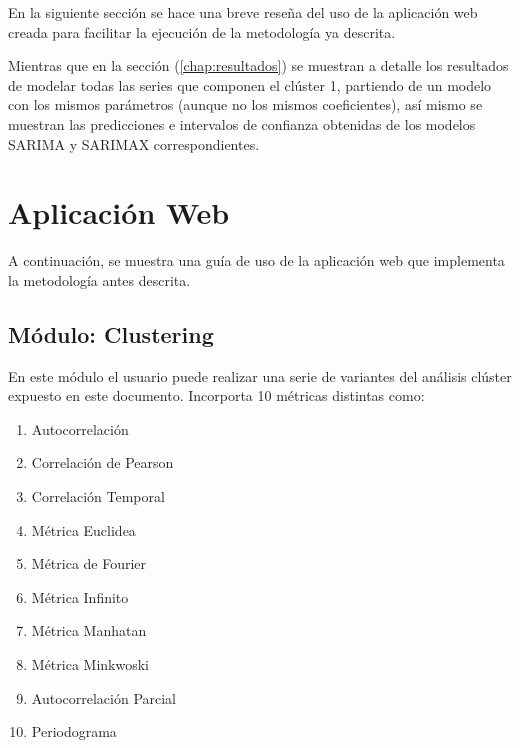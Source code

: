 \documentclass[12pt,oneside]{book}\usepackage[]{graphicx}\usepackage[]{color}
\theoremstyle{definition} %
\begin{document}
En la siguiente sección se hace una breve reseña del uso de la aplicación web creada para facilitar la ejecución de la metodología ya descrita.

Mientras que en la sección (\autoref{chap:resultados}) se muestran a detalle los resultados de modelar todas las series que componen el clúster 1, partiendo de un modelo con los mismos parámetros (aunque no los mismos coeficientes), así mismo se muestran las predicciones e intervalos de confianza obtenidas de los modelos SARIMA y SARIMAX correspondientes.



















\chapter{Aplicación Web}
\label{chp:webapp}

A continuación, se muestra una guía de uso de la aplicación web que implementa la metodología antes descrita.


\section{Módulo: Clustering}

En este módulo el usuario puede realizar una serie de variantes del análisis clúster expuesto en este documento. Incorporta 10 métricas distintas como:

\begin{enumerate}
\item Autocorrelación
\item Correlación de Pearson
\item Correlación Temporal
\item Métrica Euclidea
\item Métrica de Fourier
\item Métrica Infinito
\item Métrica Manhatan
\item Métrica Minkwoski
\item Autocorrelación Parcial
\item Periodograma
\end{enumerate}
\end{document}
